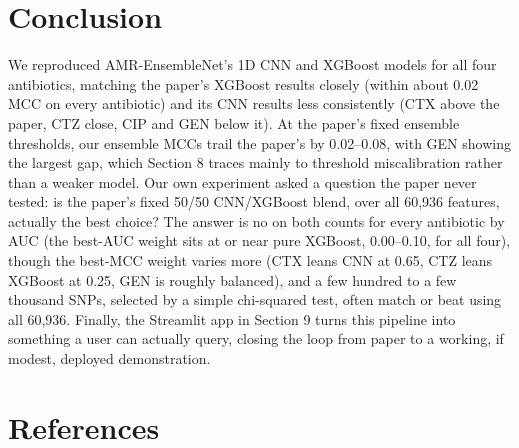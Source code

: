 \documentclass[11pt]{article}
\begin{document}
\section{Conclusion}

We reproduced AMR-EnsembleNet's 1D CNN and XGBoost models for all four antibiotics, matching the paper's XGBoost results closely (within about 0.02 MCC on every antibiotic) and its CNN results less consistently (CTX above the paper, CTZ close, CIP and GEN below it). At the paper's fixed ensemble thresholds, our ensemble MCCs trail the paper's by 0.02--0.08, with GEN showing the largest gap, which Section 8 traces mainly to threshold miscalibration rather than a weaker model. Our own experiment asked a question the paper never tested: is the paper's fixed 50/50 CNN/XGBoost blend, over all 60,936 features, actually the best choice? The answer is no on both counts for every antibiotic by AUC (the best-AUC weight sits at or near pure XGBoost, 0.00--0.10, for all four), though the best-MCC weight varies more (CTX leans CNN at 0.65, CTZ leans XGBoost at 0.25, GEN is roughly balanced), and a few hundred to a few thousand SNPs, selected by a simple chi-squared test, often match or beat using all 60,936. Finally, the Streamlit app in Section 9 turns this pipeline into something a user can actually query, closing the loop from paper to a working, if modest, deployed demonstration.

\section{References}
\end{document}
